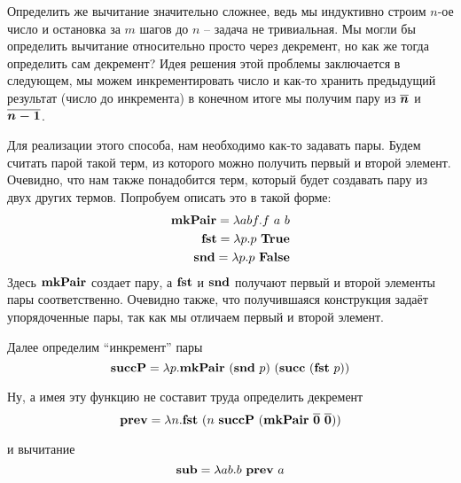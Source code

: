 \documentclass[lambda.tex]{subfiles}
\begin{document}
Определить же вычитание значительно сложнее, ведь мы индуктивно строим $n$-ое число и остановка за $m$ шагов до $n$ -- задача не тривиальная. Мы могли бы определить вычитание относительно просто через декремент, но как же тогда определить сам декремент?
Идея решения этой проблемы заключается в следующем, мы можем инкрементировать число и как-то хранить предыдущий результат (число до инкремента) в конечном итоге мы получим пару из $\boldsymbol{\overline{n}}$ и $\boldsymbol{\overline{n-1}}$.

Для реализации этого способа, нам необходимо как-то задавать пары. Будем считать парой такой терм, из которого можно получить первый и второй элемент. Очевидно, что нам также понадобится терм, который будет создавать пару из двух других термов. Попробуем описать это в такой форме:
\begin{align*}
	\text{\textbf{mkPair}} = \lambda abf.f\ a\ b\\
	\text{\textbf{fst}} = \lambda p.p\ \text{\textbf{True}}\\
	\text{\textbf{snd}} = \lambda p.p\ \text{\textbf{False}}
\end{align*}
Здесь $\text{\textbf{mkPair}}$ создает пару, а $\text{\textbf{fst}}$ и $\text{\textbf{snd}}$ получают первый и второй элементы пары соответственно. Очевидно также, что получившаяся конструкция задаёт упорядоченные пары, так как мы отличаем первый и второй элемент.

Далее определим ``инкремент'' пары
\[\mmterm{succP} = \lambda p. \mmterm{mkPair}\ (\mmterm{snd}\ p)\ (\mmterm{succ}\ (\mmterm{fst}\ p))\]

Ну, а имея эту функцию не составит труда определить декремент
\[\mmterm{prev} = \lambda n.\mmterm{fst}\ (n\ \mmterm{succP}\ (\mmterm{mkPair}\ \mmchurchn{0}\ \mmchurchn{0}))\]

и вычитание
\[\mmterm{sub} = \lambda ab.b\ \mmterm{prev}\ a\]

\end{document}
